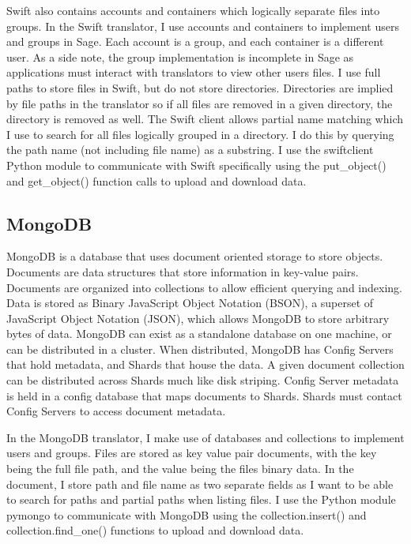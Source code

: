 Swift also contains accounts and containers which logically separate files into groups. In the Swift translator, I use accounts and containers to implement users and groups in Sage. Each account is a group, and each container is a different user. As a side note, the group implementation is incomplete in Sage as applications must interact with translators to view other users files. I use full paths to store files in Swift, but do not store directories. Directories are implied by file paths in the translator so if all files are removed in a given directory, the directory is removed as well. The Swift client allows partial name matching which I use to search for all files logically grouped in a directory. I do this by querying the path name (not including file name) as a substring. I use the swiftclient Python module to communicate with Swift specifically using the put\_object() and get\_object() function calls to upload and download data.


\subsection{MongoDB}

MongoDB is a database that uses document oriented storage to store objects. Documents are data structures that store information in key-value pairs. Documents are organized into collections to allow efficient querying and indexing. Data is stored as Binary JavaScript Object Notation (BSON), a superset of JavaScript Object Notation (JSON), which allows MongoDB to store arbitrary bytes of data. MongoDB can exist as a standalone database on one machine, or can be distributed in a cluster. When distributed, MongoDB has Config Servers that hold metadata, and Shards that house the data. A given document collection can be distributed across Shards much like disk striping. Config Server metadata is held in a config database that maps documents to Shards. Shards must contact Config Servers to access document metadata.

In the MongoDB translator, I make use of databases and collections to implement users and groups. Files are stored as key value pair documents, with the key being the full file path, and the value being the files binary data. In the document, I store path and file name as two separate fields as I want to be able to search for paths and partial paths when listing files. I use the Python module pymongo to communicate with MongoDB using the collection.insert() and collection.find\_one() functions to upload and download data.


